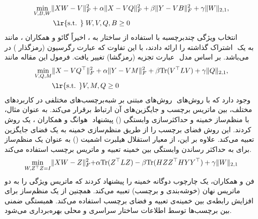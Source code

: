 	\begin{align}\label{SCMFS}
		\min_{\boldmath{V} ,\boldmath{B},\boldmath{W}}&\lVert\boldmath{XW}-\boldmath{V}\rVert^2_F + \alpha\lVert\boldmath{X}-\boldmath{V}\boldmath{Q}\rVert^2_F + 
		\beta\lVert\boldmath{Y}-\boldmath{V}\boldmath{B}\rVert^2_F +\gamma\lVert\boldmath{W}\lVert_{2,1},\nonumber\\&
		\;{\text{\lr{s.t. }}\;}{\boldmath{W},\boldmath{V},\boldmath{Q},\boldmath{B}}\geq 0
	\end{align}  
	اخیراً گائو و همکاران \cite{gao2021multilabel}، مانند ‎، انتخاب ویژگی چندبرچسبه با استفاده از ساختار به اشتراک گذاشته را ارائه دادند، با این تفاوت که عبارت رگرسیون (رمزگذار ) در ‎‎ به یک عبارت تجزیه (رمزگشا) تغییر یافت. فرمول این مقاله مانند ‎‎ بر اساس مدل‎ 
	.‎می‌باشد
	\begin{align}
		\min_{\boldmath{V},\boldmath{Q},\boldmath{M}}&\lVert\boldmath{X}-\boldmath{V}\boldmath{Q}^\top\rVert^2_F + \alpha \lVert\boldmath{Y}-\boldmath{V}\boldmath{M}\rVert^2_F +\beta\mathrm{Tr}(\boldmath{V}^\top \boldmath{LV}) + \gamma\lVert\boldmath{Q}\lVert_{2,1},\nonumber\\&
		{\text{\lr{s.t. }}}{\boldmath{V},\boldmath{M},\boldmath{Q}}\geq 0
	\end{align}
	روش‌های مبتنی بر شبه‌برچسب‌های مختلفی در کاربردهای ‎‎ وجود دارد که با روش‌های مختلف، بین ماتریس برچسب و جایگزین‌های آن ارتباط برقرار می‌کند. به عنوان مثال، هوانگ و همکاران \cite{huang2021multi}، یک روش ‎‎ با منظم‌ساز خمینه و حداکثرسازی وابستگی 
	() 
	پیشنهاد کردند. این روش فضای برچسب را از طریق منظم‌سازی خمینه به یک فضای جایگزین تعبیه می‌کند. علاوه بر این، از معیار استقلال هیلبرت اشمیت 
	() 
	به عنوان یک منظم‌ساز برای به حداکثر رساندن وابستگی بین خمینه تعبیه و ماتریس برچسب استفاده می‌کند.
	\begin{align}
		\min_{\boldmath{W},\boldmath{Z}^\top\boldmath{Z}={\boldmath{I}}}\lVert{\boldmath{XW}-\boldmath{Z}}\lVert^2_F + \alpha\mathrm{Tr}(\boldmath{Z}^\top \boldmath{LZ}) - \beta\mathrm{Tr}(\boldmath{HZ}\boldmath{Z}^\top \boldmath{HY}\boldmath{Y}^\top)+ \gamma\lVert{\boldmath{W}}\lVert_{2,1}
	\end{align}
	فن و همکاران\cite{fan2021manifold}، یک چارچوب دوگانه خمینه را پیشنهاد کردند که ماتریس ویژگی را به دو ماتریس نهان (خوشه‌بندی و برچسب) تعبیه می‌کند. همچنین از یک منظم‌ساز برای افزایش رابطه‌ی بین خمینه‌ی تعبیه و فضای برچسب استفاده می‌کند. همبستگی ضمنی بین برچسب‌ها توسط اطلاعات ساختار سراسری و محلی بهره‌برداری می‌شود.
